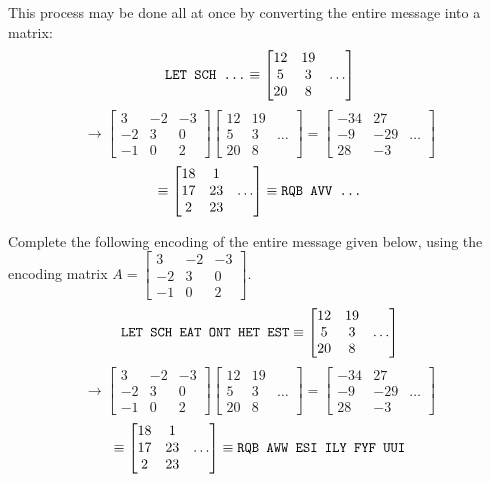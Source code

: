 \begin{observation}
This process may be done all at once by converting the entire message into a matrix:
\[
\text{\texttt{LET SCH ...}}
\equiv
\begin{bmatrix}12&19\\5&3&\dots\\20&8\end{bmatrix}
\]
\[
\to
\begin{bmatrix}3&-2&-3\\-2&3&0\\-1&0&2\end{bmatrix}\begin{bmatrix}12&19\\5&3&\dots\\20&8\end{bmatrix}=
\begin{bmatrix}-34&27\\-9&-29&\dots\\28&-3\end{bmatrix}
\]
\[
\equiv
\begin{bmatrix}18&1\\17&23&\dots\\2&23\end{bmatrix}
\equiv
\text{\texttt{RQB AVV ...}}
\]
\end{observation}

\begin{activity}{10}
Complete the following encoding of the entire message given below,
using the encoding matrix \(A=\begin{bmatrix}3&-2&-3\\-2&3&0\\-1&0&2\end{bmatrix}\).
\[
\text{\texttt{LET SCH EAT ONT HET EST}}
\equiv
\begin{bmatrix}12&19\\5&3&\dots\\20&8\end{bmatrix}
\]
\[
\to
\begin{bmatrix}3&-2&-3\\-2&3&0\\-1&0&2\end{bmatrix}\begin{bmatrix}12&19\\5&3&\dots\\20&8\end{bmatrix}=
\begin{bmatrix}-34&27\\-9&-29&\dots\\28&-3\end{bmatrix}
\]
\[
\equiv
\begin{bmatrix}18&1\\17&23&\dots\\2&23\end{bmatrix}
\equiv
\text{\texttt{RQB AWW ESI ILY FYF UUI}}
\]
\end{activity}

